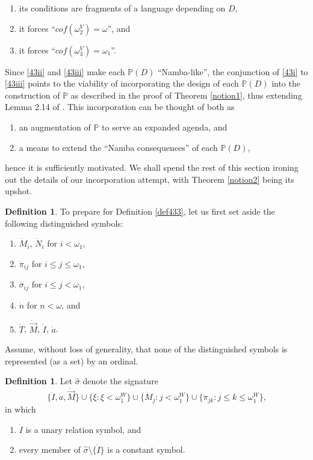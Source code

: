 \documentclass[12pt, twoside]{memoir}
\numberwithin{equation}{section}
\theoremstyle{definition}
\newtheorem{defi}[thm]{Definition}
\theoremstyle{remark}
\theoremstyle{definition}
\theoremstyle{definition}
\theoremstyle{definition}
\theoremstyle{remark}
\begin{document}
\begin{enumerate}[label=(\roman*)]
    \item\label{43i} its conditions are fragments of a language depending on $D$,
    \item\label{43ii} it forces ``$cof(\omega_2^V) = \omega$'', and
    \item\label{43iii} it forces ``$cof(\omega_3^V) = \omega_1$''.
\end{enumerate}
Since \ref{43ii} and \ref{43iii} make each $\mathbb{P}(D)$ ``Namba-like'', the conjunction of \ref{43i} to \ref{43iii} points to the viability of incorporating the design of each $\mathbb{P}(D)$ into the construction of $\mathbb{P}$ as described in the proof of Theorem \ref{notion1}, thus extending Lemma 2.14 of \cite{schindler}. This incorporation can be thought of both as
\begin{enumerate}[label=(\Alph*)]
    \item an augmentation of $\mathbb{P}$ to serve an expanded agenda, and
    \item a means to extend the ``Namba consequences'' of each $\mathbb{P}(D)$,
\end{enumerate}
hence it is sufficiently motivated. We shall spend the rest of this section ironing out the details of our incorporation attempt, with Theorem \ref{notion2} being its upshot.

\begin{defi}\label{defl2}
To prepare for Definition \ref{def433}, let us first set aside the following distinguished symbols:
\begin{enumerate}[label=(\alph*)]
    \item $\dot{M}_i$, $\dot{N}_i$ for $i < \omega_1$,
    \item $\dot{\pi}_{ij}$ for $i \leq j \leq \omega_1$,
    \item $\dot{\sigma}_{ij}$ for $i \leq j < \omega_1$,
    \item $\dot{n}$ for $n < \omega$, and
    \item $\dot{T}$, $\dot{\Vec{M}}$, $\dot{I}$, $\dot{a}$.
\end{enumerate}
Assume, without loss of generality, that none of the distinguished symbols is represented (as a set) by an ordinal.
\end{defi}

\begin{defi}
Let $\hat{\sigma}$ denote the signature
\begin{equation*}
    \{\dot{I}, \dot{a}, \dot{\Vec{M}}\} \cup \{\xi : \xi < \omega_1^W\} \cup \{\dot{M}_j : j < \omega_1^W\} \cup \{\dot{\pi}_{jk} : j \leq k \leq \omega_1^W\} \text{,}
\end{equation*}
in which
\begin{enumerate}[label=(\alph*)]
    \item $\dot{I}$ is a unary relation symbol, and
    \item every member of $\hat{\sigma} \setminus \{\dot{I}\}$ is a constant symbol.
\end{enumerate}
\end{defi}
\end{document}
